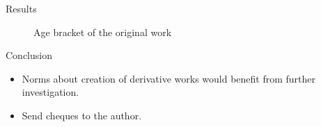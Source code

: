 \documentclass{beamer}
\begin{document}
\begin{frame}{Results}
\begin{figure}[H]
{Age bracket of the original work\vspace{1.0em}}
\scalebox{0.5}{}
\end{figure}
  
\end{frame}

\begin{frame}{Conclusion}
  \begin{itemize}
  \item Norms about creation of derivative works would benefit from further investigation.
  \item Send cheques to the author.
  \end{itemize}
\end{frame}
\end{document}
